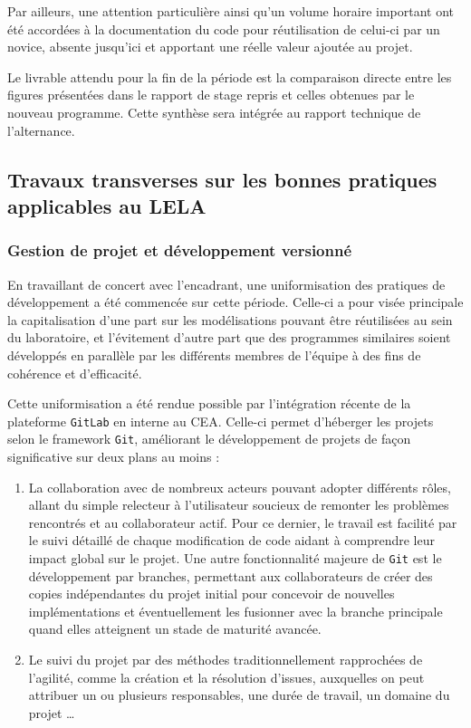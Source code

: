Par ailleurs, une attention particulière ainsi qu'un volume horaire important ont été accordées à la documentation du code pour réutilisation de celui-ci par un novice, absente jusqu'ici et apportant une réelle valeur ajoutée au projet.

Le livrable attendu pour la fin de la période est la comparaison directe entre les figures présentées dans le rapport de stage repris et celles obtenues par le nouveau programme.
Cette synthèse sera intégrée au rapport technique de l'alternance.

\subsection{Travaux transverses sur les bonnes pratiques applicables au LELA}\label{sec:travaux-transverses-sur-les-bonnes-pratiques-applicables-au-lela}
\subsubsection{Gestion de projet et développement versionné}\label{subsec:gestion-de-projet-et-developpement-versionne}
En travaillant de concert avec l'encadrant, une uniformisation des pratiques de développement a été commencée sur cette période.
Celle-ci a pour visée principale la capitalisation d'une part sur les modélisations pouvant être réutilisées au sein du laboratoire, et l'évitement d'autre part que des programmes similaires soient développés en parallèle par les différents membres de l'équipe à des fins de cohérence et d'efficacité.

Cette uniformisation a été rendue possible par l'intégration récente de la plateforme \texttt{GitLab} en interne au \gls{CEA}.
Celle-ci permet d'héberger les projets selon le framework \texttt{Git}, améliorant le développement de projets de façon significative sur deux plans au moins :
\begin{enumerate}
    \item La collaboration avec de nombreux acteurs pouvant adopter différents rôles, allant du simple relecteur à l'utilisateur soucieux de remonter les problèmes rencontrés et au collaborateur actif.
    Pour ce dernier, le travail est facilité par le suivi détaillé de chaque modification de code aidant à comprendre leur impact global sur le projet.
    Une autre fonctionnalité majeure de \texttt{Git} est le développement par branches, permettant aux collaborateurs de créer des copies indépendantes du projet initial pour concevoir de nouvelles implémentations et éventuellement les fusionner avec la branche principale quand elles atteignent un stade de maturité avancée.
    \item Le suivi du projet par des méthodes traditionnellement rapprochées de l'agilité, comme la création et la résolution d'issues, auxquelles on peut attribuer un ou plusieurs responsables, une durée de travail, un domaine du projet \ldots
\end{enumerate}

